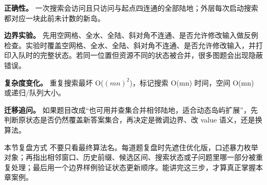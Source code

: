 \textbf{正确性。} 一次搜索会访问且只访问与起点四连通的全部陆地；外层每次启动搜索都对应一块此前未计数的新岛。

\textbf{边界实验。} 先用空网格、全水、全陆、斜对角不连通、是否允许修改输入做反例检查。实验时覆盖空网格、全水、全陆、斜对角不连通、是否允许修改输入，并打印入队时的完整状态。若同一位置但资源不同的状态被合并，很多图题会出现隐蔽错误。

\textbf{复杂度变化。} 重复搜索最坏 O(\ensuremath{(mn)^{2}})，标记搜索 O(mn) 时间，空间 O(mn) 或递归/队列大小。

\textbf{迁移追问。} 如果题目改成“也可用并查集合并相邻陆地，适合动态岛屿扩展”，先判断原状态是否仍然覆盖新答案集合，再决定是微调边界、改 value 语义，还是换算法。

\begin{principlebox}{本节复盘方式}
不要只看最终算法名。每道题复盘时先遮住优化版，口述暴力枚举对象；再指出相邻窗口、历史前缀、候选区间、搜索状态或子问题里哪一部分被重复处理；最后用一个边界样例验证状态更新顺序。能讲完这三步，才算真正掌握本章案例。
\end{principlebox}
